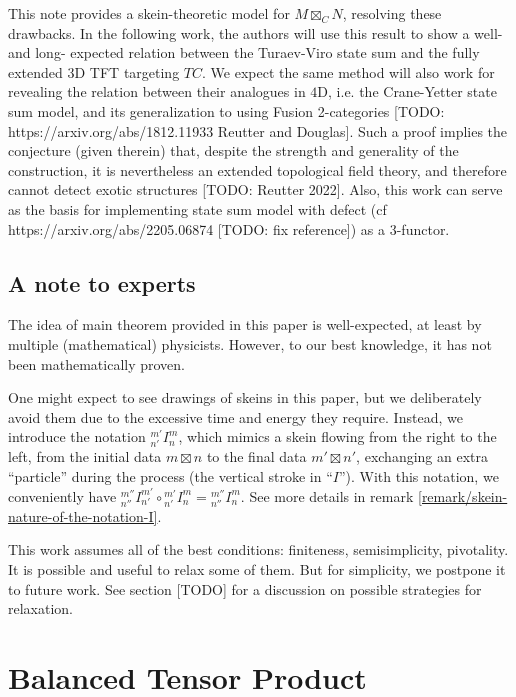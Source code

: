 This note provides a skein-theoretic model for $M \boxtimes_{C} N$, resolving these
drawbacks. In the following work, the authors will use this result to show a
well- and long- expected relation between the Turaev-Viro state sum and the
fully extended $3$D TFT targeting $TC$. We expect the same method will also
work for revealing the relation between their analogues in $4$D, i.e. the
Crane-Yetter state sum model, and its generalization to using Fusion
2-categories [TODO: https://arxiv.org/abs/1812.11933 Reutter and Douglas].
Such a proof implies the conjecture (given therein) that, despite the strength
and generality of the construction, it is nevertheless an extended topological
field theory, and therefore cannot detect exotic structures [TODO: Reutter
2022]. Also, this work can serve as the basis for implementing state sum model
with defect (cf https://arxiv.org/abs/2205.06874 [TODO: fix reference]) as a
3-functor.

\subsection*{A note to experts}\label{subsection/a-note-to-experts}

The idea of main theorem provided in this paper is well-expected, at least by
multiple (mathematical) physicists. However, to our best knowledge, it has not
been mathematically proven.

One might expect to see drawings of skeins in this paper, but we deliberately
avoid them due to the excessive time and energy they require. Instead, we
introduce the notation ${}^{m'}_{n'}I^{m}_{n}$, which mimics a skein flowing
from the right to the left, from the initial data $m \boxtimes n$ to the final data
$m' \boxtimes n'$, exchanging an extra ``particle'' during the process (the vertical
stroke in ``$I$''). With this notation, we conveniently have
${}^{m''}_{n''}I^{m'}_{n'} \circ {}^{m'}_{n'}I^{m}_{n} = {}^{m''}_{n''}I^{m}_{n}$.
See more details in remark \ref{remark/skein-nature-of-the-notation-I}.

This work assumes all of the best conditions: finiteness, semisimplicity,
pivotality. It is possible and useful to relax some of them. But for
simplicity, we postpone it to future work. See section [TODO] for a discussion
on possible strategies for relaxation.

\section{Balanced Tensor Product}\label{section/balanced-tensor-product}

